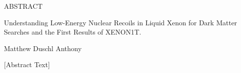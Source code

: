 
\pagestyle{empty} %
\begin{center}
  ABSTRACT

    Understanding Low-Energy Nuclear Recoils in Liquid Xenon for Dark Matter Searches and the First Results of XENON1T.

    Matthew Duschl Anthony
\end{center}

[Abstract Text]